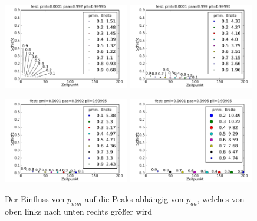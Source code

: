 \begin{figure}[h]
\includegraphics[width=0.49\textwidth]{bilder/pmm/3fest_p_00001_0997_099995}
\includegraphics[width=0.49\textwidth]{bilder/pmm/3fest_p_00001_0999_099995}

\vspace*{5pt}

\includegraphics[width=0.49\textwidth]{bilder/pmm/3fest_p_00001_09992_099995}
\includegraphics[width=0.49\textwidth]{bilder/pmm/3fest_p_00001_09996_099995}
\caption[Der Einfluss von $p_{mm}$ auf die Peaks abhängig von $p_{aa}$]{Der Einfluss von $p_{mm}$ auf die Peaks abhängig von $p_{aa}$, welches von oben links nach unten rechts größer wird}
\label{einfluss_pmm_1}
\end{figure}



